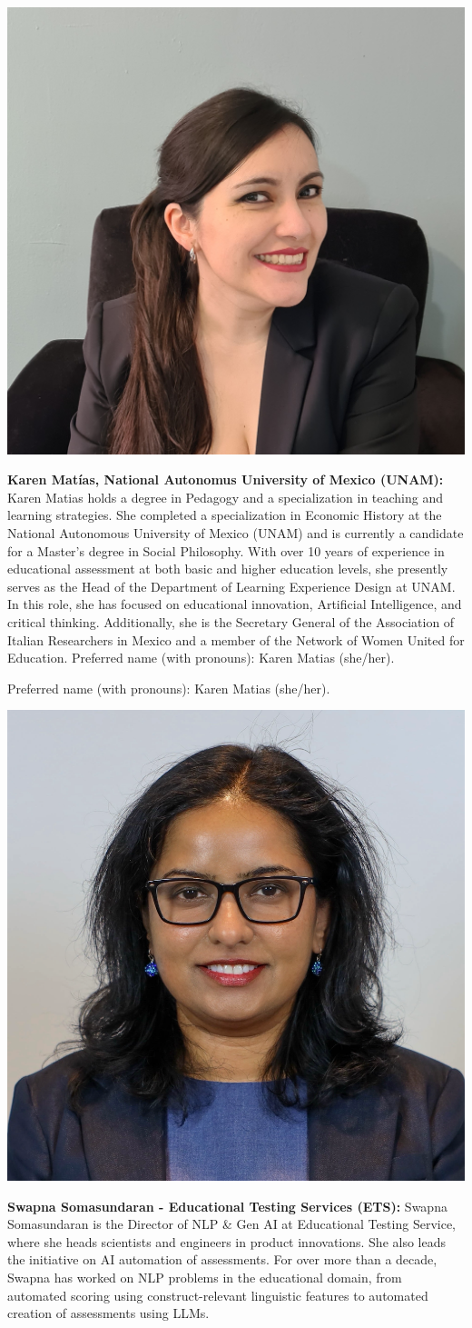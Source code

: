 \vspace{1em}
\begin{center}
\includegraphics[width=0.4\linewidth]{content/day2/karen.png}
\end{center}
{\bfseries Karen Matías, National Autonomus University of Mexico (UNAM):}
Karen Matias holds a degree in Pedagogy and a specialization in teaching and learning strategies. She completed a specialization in Economic History at the National Autonomous University of Mexico (UNAM) and is currently a candidate for a Master’s degree in Social Philosophy. With over 10 years of experience in educational assessment at both basic and higher education levels, she presently serves as the Head of the Department of Learning Experience Design at UNAM. In this role, she has focused on educational innovation, Artificial Intelligence, and critical thinking. Additionally, she is the Secretary General of the Association of Italian Researchers in Mexico and a member of the Network of Women United for Education. Preferred name (with pronouns): Karen Matias (she/her).

Preferred name (with pronouns): Karen Matias (she/her).


\vspace{1em}
\begin{center}
\includegraphics[width=0.4\linewidth]{content/day2/swapna.png}
\end{center}
{\bfseries Swapna Somasundaran - Educational Testing Services (ETS):}
Swapna Somasundaran is the Director of NLP \& Gen AI at Educational Testing Service, where she heads scientists and engineers in product innovations. She also leads the initiative on AI automation of assessments. For over more than a decade, Swapna has worked on NLP problems in the educational domain, from automated scoring using construct-relevant linguistic features to automated creation of assessments using LLMs.

